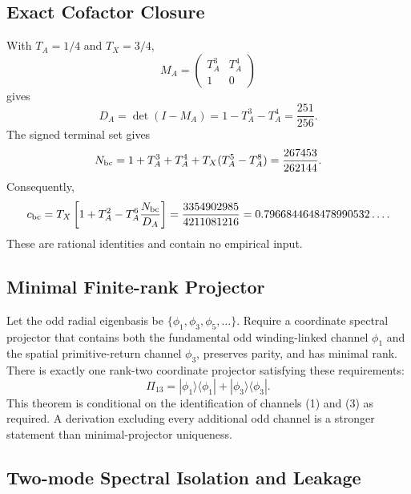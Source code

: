 \subsection{Exact Cofactor Closure}
\label{subsec:pr35-exact-cofactor}

With $T_A=1/4$ and $T_X=3/4$,
\begin{equation}
M_A
=
\begin{pmatrix}
T_A^3&T_A^4\\
1&0
\end{pmatrix}
\end{equation}
gives
\begin{equation}
D_A
=
\det(I-M_A)
=
1-T_A^3-T_A^4
=
\frac{251}{256}.
\label{eq:pr35-da-exact}
\end{equation}
The signed terminal set gives
\begin{equation}
N_{\rm bc}
=
1+T_A^3+T_A^4+T_X(T_A^5-T_A^8)
=
\frac{267453}{262144}.
\label{eq:pr35-nbc-exact}
\end{equation}
Consequently,
\begin{equation}
c_{\rm bc}
=
T_X\left[1+T_A^2-T_A^6\frac{N_{\rm bc}}{D_A}\right]
=
\frac{3354902985}{4211081216}
=
0.7966844648478990532\ldots .
\label{eq:pr35-cbc-exact}
\end{equation}
These are rational identities and contain no empirical input.

\subsection{Minimal Finite-rank Projector}
\label{subsec:pr35-pi13-uniqueness}

Let the odd radial eigenbasis be \(\{\phi_1,\phi_3,\phi_5,\ldots\}\).  Require a coordinate spectral projector that contains both the fundamental odd winding-linked channel \(\phi_1\) and the spatial primitive-return channel \(\phi_3\), preserves
parity, and has minimal rank.  There is exactly one rank-two coordinate projector satisfying these requirements:
\begin{equation}
\boxed{
\Pi_{13}
=
|\phi_1\rangle\langle\phi_1|
+
|\phi_3\rangle\langle\phi_3|.}
\label{eq:pr35-pi13-unique}
\end{equation}
This theorem is conditional on the identification of channels (1) and (3) as required.  A derivation excluding every additional odd channel is a stronger statement than minimal-projector uniqueness.

\subsection{Two-mode Spectral Isolation and Leakage}
\label{subsec:pr35-two-mode-leakage}

